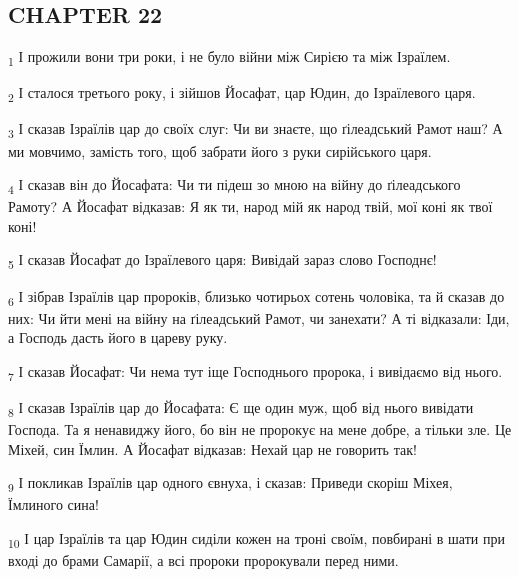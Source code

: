 \subsection{CHAPTER 22}
\begin{tcolorbox}
\textsubscript{1} І прожили вони три роки, і не було війни між Сирією та між Ізраїлем.
\end{tcolorbox}
\begin{tcolorbox}
\textsubscript{2} І сталося третього року, і зійшов Йосафат, цар Юдин, до Ізраїлевого царя.
\end{tcolorbox}
\begin{tcolorbox}
\textsubscript{3} І сказав Ізраїлів цар до своїх слуг: Чи ви знаєте, що ґілеадський Рамот наш? А ми мовчимо, замість того, щоб забрати його з руки сирійського царя.
\end{tcolorbox}
\begin{tcolorbox}
\textsubscript{4} І сказав він до Йосафата: Чи ти підеш зо мною на війну до ґілеадського Рамоту? А Йосафат відказав: Я як ти, народ мій як народ твій, мої коні як твої коні!
\end{tcolorbox}
\begin{tcolorbox}
\textsubscript{5} І сказав Йосафат до Ізраїлевого царя: Вивідай зараз слово Господнє!
\end{tcolorbox}
\begin{tcolorbox}
\textsubscript{6} І зібрав Ізраїлів цар пророків, близько чотирьох сотень чоловіка, та й сказав до них: Чи йти мені на війну на ґілеадський Рамот, чи занехати? А ті відказали: Іди, а Господь дасть його в цареву руку.
\end{tcolorbox}
\begin{tcolorbox}
\textsubscript{7} І сказав Йосафат: Чи нема тут іще Господнього пророка, і вивідаємо від нього.
\end{tcolorbox}
\begin{tcolorbox}
\textsubscript{8} І сказав Ізраїлів цар до Йосафата: Є ще один муж, щоб від нього вивідати Господа. Та я ненавиджу його, бо він не пророкує на мене добре, а тільки зле. Це Міхей, син Їмлин. А Йосафат відказав: Нехай цар не говорить так!
\end{tcolorbox}
\begin{tcolorbox}
\textsubscript{9} І покликав Ізраїлів цар одного євнуха, і сказав: Приведи скоріш Міхея, Їмлиного сина!
\end{tcolorbox}
\begin{tcolorbox}
\textsubscript{10} І цар Ізраїлів та цар Юдин сиділи кожен на троні своїм, повбирані в шати при вході до брами Самарії, а всі пророки пророкували перед ними.
\end{tcolorbox}
